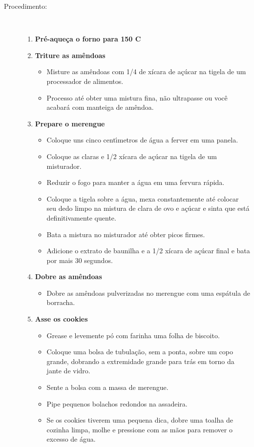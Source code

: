 \documentclass [11pt, letterpaper] {article}
\begin{document}
\begin {description}
\item [Procedimento:] \ \\
\begin {enumerate}
\item {\bf Pré-aqueça o forno para 150 C}
\item {\bf Triture as amêndoas}
\begin {itemize}
\item Misture as amêndoas com 1/4 de xícara de açúcar na tigela de um processador de alimentos.
        \item Processo até obter uma mistura fina, não ultrapasse ou você acabará com manteiga de amêndoa.
\end {itemize}
\item {\bf Prepare o merengue}
\begin {itemize}
\item Coloque uns cinco cent\'{\i}metros de água a ferver em uma panela.
\item Coloque as claras e 1/2 xícara de açúcar na tigela de um misturador.
\item Reduzir o fogo para manter a água em uma fervura rápida.
\item Coloque a tigela sobre a água, mexa constantemente até colocar seu dedo limpo na mistura de clara de ovo e açúcar e sinta que est\'a definitivamente quente.
\item Bata a mistura no misturador até obter picos firmes.
\item Adicione o extrato de baunilha e a 1/2 xícara de açúcar final e bata por mais 30 segundos.
\end {itemize}
\item {\bf Dobre as amêndoas}
\begin {itemize}
\item Dobre as amêndoas pulverizadas no merengue com uma espátula de borracha.
\end {itemize}
\item {\bf Asse os cookies}
\begin {itemize}
\item Grease e levemente pó com farinha uma folha de biscoito.
\item Coloque uma bolsa de tubulação, sem a ponta, sobre um copo grande, dobrando a extremidade grande para trás em torno da jante de vidro.
\item Sente a bolsa com a massa de merengue.
\item Pipe pequenos bolachos redondos na assadeira.
\item Se os cookies tiverem uma pequena dica, dobre uma toalha de cozinha limpa, molhe e pressione com as mãos para remover o excesso de água.

\end{itemize}
\end{enumerate}
\end{description}
\end{document}

